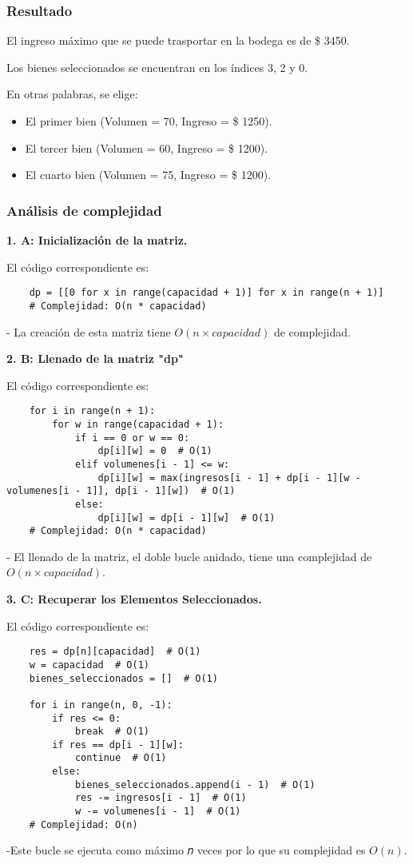 \subsubsection{Resultado}
El ingreso máximo que se puede trasportar en la bodega es de \$ 3450.

Los bienes seleccionados se encuentran en los índices 3, 2 y 0.

En otras palabras, se elige:
\begin{itemize}
\item El primer bien (Volumen = 70, Ingreso = \$ 1250).
\item El tercer bien (Volumen = 60, Ingreso = \$ 1200).
\item El cuarto bien (Volumen = 75, Ingreso = \$ 1200).
 \end{itemize}

\subsubsection{Análisis de complejidad}


\textbf{1. A: Inicialización de la matriz.}

El código correspondiente es:
\begin{lstlisting}
	dp = [[0 for x in range(capacidad + 1)] for x in range(n + 1)]
	# Complejidad: O(n * capacidad)
\end{lstlisting}

- La creación de esta matriz tiene \( O(n \times capacidad) \) de complejidad. 

\textbf{2. B: Llenado de la matriz "dp"}

El código correspondiente es:
\begin{lstlisting}
	for i in range(n + 1):
		for w in range(capacidad + 1):
			if i == 0 or w == 0:
				dp[i][w] = 0  # O(1)
			elif volumenes[i - 1] <= w:
				dp[i][w] = max(ingresos[i - 1] + dp[i - 1][w - volumenes[i - 1]], dp[i - 1][w])  # O(1)
			else:
				dp[i][w] = dp[i - 1][w]  # O(1)
	# Complejidad: O(n * capacidad)
\end{lstlisting}

- El llenado de la matriz, el doble bucle anidado, tiene una complejidad de \( O(n \times capacidad) \).

\textbf{3. C: Recuperar los Elementos Seleccionados.}

El código correspondiente es:
\begin{lstlisting}
	res = dp[n][capacidad]  # O(1)
	w = capacidad  # O(1)
	bienes_seleccionados = []  # O(1)
	
	for i in range(n, 0, -1):
		if res <= 0:
			break  # O(1)
		if res == dp[i - 1][w]:
			continue  # O(1)
		else:
			bienes_seleccionados.append(i - 1)  # O(1)
			res -= ingresos[i - 1]  # O(1)
			w -= volumenes[i - 1]  # O(1)
	# Complejidad: O(n)
\end{lstlisting}
-Este bucle se ejecuta como máximo 𝑛 veces por lo que su complejidad es \( O(n) \).

